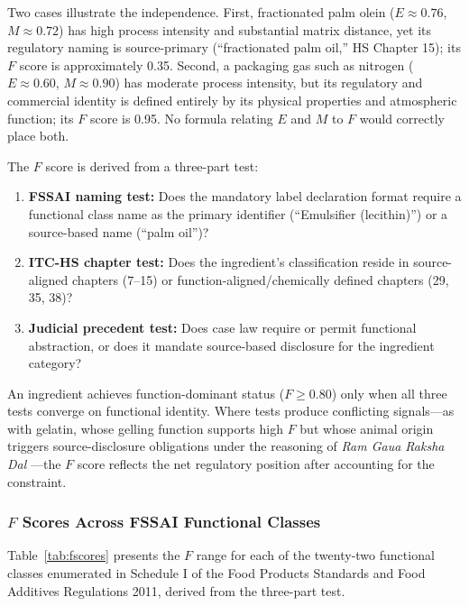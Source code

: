\documentclass[12pt,a3paper]{article}
\begin{document}
Two cases illustrate the independence. First, fractionated palm olein ($E \approx 0.76$, $M \approx 0.72$) has high process intensity and substantial matrix distance, yet its regulatory naming is source-primary (``fractionated palm oil,'' HS Chapter 15); its $F$ score is approximately 0.35. Second, a packaging gas such as nitrogen ($E \approx 0.60$, $M \approx 0.90$) has moderate process intensity, but its regulatory and commercial identity is defined entirely by its physical properties and atmospheric function; its $F$ score is 0.95. No formula relating $E$ and $M$ to $F$ would correctly place both.

The $F$ score is derived from a three-part test:

\begin{enumerate}
  \item \textbf{FSSAI naming test:} Does the mandatory label declaration format require a functional class name as the primary identifier (``Emulsifier (lecithin)'') or a source-based name (``palm oil'')?
  \item \textbf{ITC-HS chapter test:} Does the ingredient's classification reside in source-aligned chapters (7--15) or function-aligned/chemically defined chapters (29, 35, 38)?
  \item \textbf{Judicial precedent test:} Does case law require or permit functional abstraction, or does it mandate source-based disclosure for the ingredient category?
\end{enumerate}

An ingredient achieves function-dominant status ($F \geq 0.80$) only when all three tests converge on functional identity. Where tests produce conflicting signals---as with gelatin, whose gelling function supports high $F$ but whose animal origin triggers source-disclosure obligations under the reasoning of \textit{Ram Gaua Raksha Dal} \cite{DelhiHC_RamGaua_2022}---the $F$ score reflects the net regulatory position after accounting for the constraint.

\subsubsection{$F$ Scores Across FSSAI Functional Classes}

Table~\ref{tab:fscores} presents the $F$ range for each of the twenty-two functional classes enumerated in Schedule I of the Food Products Standards and Food Additives Regulations 2011, derived from the three-part test.
\end{document}
